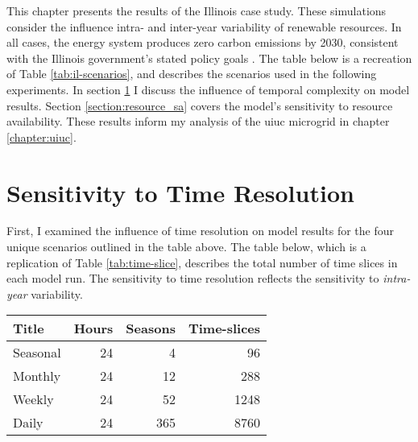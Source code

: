 This chapter presents the results of the Illinois case study. These simulations
consider the influence intra- and inter-year variability of renewable resources.
In all cases, the energy system produces zero carbon emissions by 2030,
consistent with the Illinois government's stated policy goals
\cite{harmon_climate_2021,office_of_governor_jb_pritzker_gov_2021}. The table
below is a recreation of Table \ref{tab:il-scenarios}, and describes the
scenarios used in the following experiments. In section \ref{section:time_res} I
discuss the influence of temporal complexity on model results. Section \ref{section:resource_sa}
covers the model's sensitivity to resource availability. These results inform
my analysis of the \gls{uiuc} microgrid in chapter \ref{chapter:uiuc}.

\begin{table}[H]
  \centering
\end{table}


\section{Sensitivity to Time Resolution}
\label{section:time_res}

First, I examined the influence of time resolution on model results for the four
unique scenarios outlined in the table above. The table below, which is a
replication of  Table \ref{tab:time-slice}, describes the total number of time slices in each model run.
The sensitivity to time resolution reflects the sensitivity to \textit{intra-year}
variability.

\begin{table}[H]
  \centering
  \begin{tabular}{lrrr}
    \toprule
    Title & Hours & Seasons & Time-slices \\
    \midrule
    Seasonal & 24 & 4 & 96\\
    Monthly & 24 & 12 & 288\\
    Weekly & 24 & 52 & 1248\\
    Daily & 24 & 365 & 8760\\
    \bottomrule
  \end{tabular}
\end{table}


